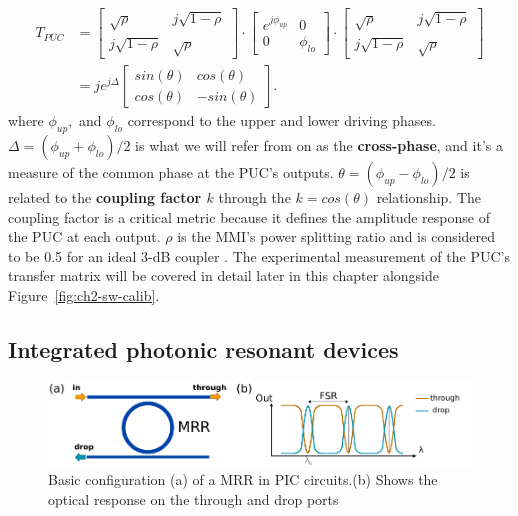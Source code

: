 \begin{equation}
	\label{eq:ch2-puc}
	\begin{aligned}
		T_{PUC} & =
		\begin{bmatrix} \sqrt{\rho} & j\sqrt{1-\rho} \\ j\sqrt{1-\rho} & \sqrt{\rho} \end{bmatrix}
		\cdot
		\begin{bmatrix} e^{j\phi_{up}} & 0 \\ 0 & \phi_{lo} \end{bmatrix}
		\cdot
		\begin{bmatrix} \sqrt{\rho} & j\sqrt{1-\rho} \\ j\sqrt{1-\rho} & \sqrt{\rho} \end{bmatrix} \\
		        & =
		je^{j\Delta}
		\begin{bmatrix}
			sin(\theta) & cos(\theta)  \\
			cos(\theta) & -sin(\theta)
		\end{bmatrix}.
	\end{aligned}
\end{equation}
where \(\phi_{up},\) and \(\phi_{lo}\) correspond to the upper and lower driving phases.
$\Delta = (\phi_{up} + \phi_{lo})/2$ is what we will refer from on as the \textbf{cross-phase}, and it's a measure of the common phase at the PUC's outputs.
$\theta = (\phi_{up} - \phi_{lo})/2$ is related to the \textbf{coupling factor \(k\)} through the \(k = cos(\theta)\) relationship.
The coupling factor is a critical metric because it defines the amplitude response of the PUC at each output.
\(\rho\) is the MMI's power splitting ratio and is considered to be 0.5 for an ideal 3-dB coupler \cite{shokraneh_theoretical_2020}.
The experimental measurement of the PUC's transfer matrix will be covered in detail later in this chapter alongside Figure~\ref{fig:ch2-sw-calib}.

\subsection{Integrated photonic resonant devices}\label{sub:integrated_photonic_resonant_devices} %
\begin{figure}
	\begin{center}
		\includegraphics{figures/ch2-ring.pdf}
	\end{center}
	\caption{Basic configuration (a) of a MRR in PIC circuits.(b) Shows the optical response on the through and drop ports}\label{fig:ch2-ring}
\end{figure}

